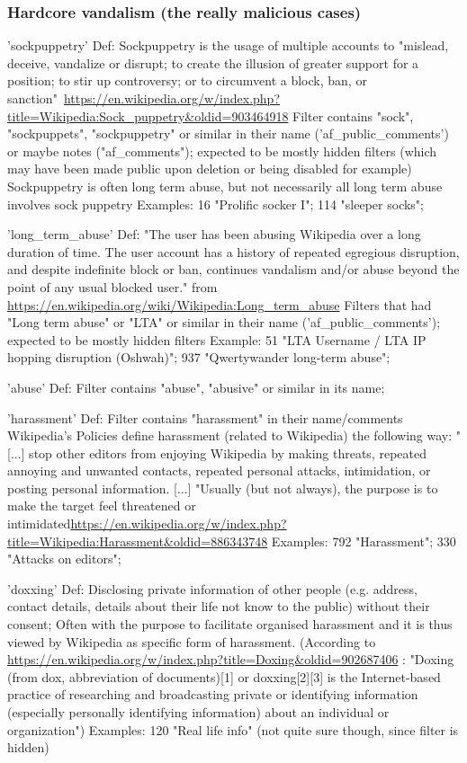 \subsubsection{Hardcore vandalism (the really malicious cases)}
'sockpuppetry'
  Def: Sockpuppetry is the usage of multiple accounts to "mislead, deceive, vandalize or disrupt; to create the illusion of greater support for a position; to stir up controversy; or to circumvent a block, ban, or sanction"~\url{https://en.wikipedia.org/w/index.php?title=Wikipedia:Sock_puppetry&oldid=903464918}
  Filter contains "sock", "sockpuppets", "sockpuppetry" or similar in their name ('af\_public\_comments') or maybe notes ("af\_comments"); expected to be mostly hidden filters (which may have been made public upon deletion or being disabled for example)
  Sockpuppetry is often long term abuse, but not necessarily all long term abuse involves sock puppetry
  Examples: 16 "Prolific socker I"; 114 "sleeper socks";

'long\_term\_abuse'
  Def:
  "The user has been abusing Wikipedia over a long duration of time. The user account has a history of repeated egregious disruption, and despite indefinite block or ban, continues vandalism and/or abuse beyond the point of any usual blocked user." from \url{https://en.wikipedia.org/wiki/Wikipedia:Long_term_abuse}
  Filters that had "Long term abuse" or "LTA" or similar in their name ('af\_public\_comments'); expected to be mostly hidden filters
  Example: 51 "LTA Username / LTA IP hopping disruption (Oshwah)"; 937 "Qwertywander long-term abuse";

'abuse'
  Def: Filter contains "abuse", "abusive" or similar in its name; %

'harassment'
  Def: Filter contains "harassment" in their name/comments
  Wikipedia's Policies define harassment (related to Wikipedia) the following way: "[...] stop other editors from enjoying Wikipedia by making threats, repeated annoying and unwanted contacts, repeated personal attacks, intimidation, or posting personal information. [...] "Usually (but not always), the purpose is to make the target feel threatened or intimidated\url{https://en.wikipedia.org/w/index.php?title=Wikipedia:Harassment&oldid=886343748}
  Examples: 792 "Harassment"; 330 "Attacks on editors";

'doxxing'
  Def: Disclosing private information of other people (e.g. address, contact details, details about their life not know to the public) without their consent; Often with the purpose to facilitate organised harassment and it is thus viewed by Wikipedia as specific form of harassment.
  (According to \url{https://en.wikipedia.org/w/index.php?title=Doxing&oldid=902687406} : "Doxing (from dox, abbreviation of documents)[1] or doxxing[2][3] is the Internet-based practice of researching and broadcasting private or identifying information (especially personally identifying information) about an individual or organization")
  Examples: 120 "Real life info" (not quite sure though, since filter is hidden)

